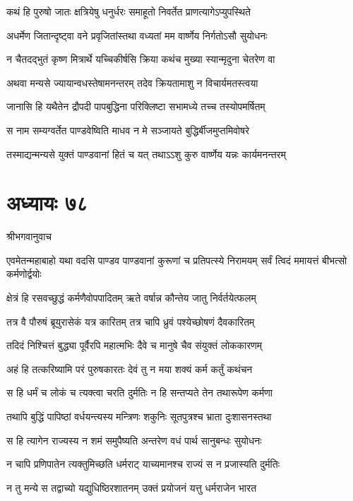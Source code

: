 \twolineshloka
{कथं हि पुरुषो जातः क्षत्रियेषु धनुर्धरः}
{समाहूतो निवर्तेत प्राणत्यागेऽप्युपस्थिते}


\twolineshloka
{अधर्मेण जितान्दृष्ट्वा वने प्रवृजितांस्तथा}
{वध्यतां मम वार्ष्णेय निर्गतोऽसौ सुयोधनः}


\twolineshloka
{न चैतदद्भुतं कृष्ण मित्रार्थे यच्चिकीर्षसि}
{क्रिया कथंच मुख्या स्यान्मृदुना चेतरेण वा}


\twolineshloka
{अथवा मन्यसे ज्यायान्वधस्तेषामनन्तरम्}
{तदेव क्रियतामाशु न विचार्यमतस्त्वया}


\twolineshloka
{जानासि हि यथैतेन द्रौपदी पापबुद्धिना}
{परिक्लिष्टा सभामध्ये तच्च तस्योपमर्षितम्}


\twolineshloka
{स नाम सम्यग्वर्तेत पाण्डवेष्विति माधव}
{न मे सञ्जायते बुद्धिर्बीजमुप्तमिवोषरे}


\twolineshloka
{तस्माद्यन्मन्यसे युक्तं पाण्डवानां हितं च यत्}
{तथाऽऽशु कुरु वार्ष्णेय यन्नः कार्यमनन्तरम्}


\chapter{अध्यायः ७८}
\twolineshloka
{श्रीभगवानुवाच}
{}


\threelineshloka
{एवमेतन्महाबाहो यथा वदसि पाण्डव}
{पाण्डवानां कुरूणां च प्रतिपत्स्ये निरामयम्}
{सर्वं त्विदं ममायत्तं बीभत्सो कर्मणोर्द्वयोः}


\twolineshloka
{क्षेत्रं हि रसवच्छुद्धं कर्मणैवोपपादितम्}
{ऋते वर्षान्न कौन्तेय जातु निर्वर्तयेत्फलम्}


\twolineshloka
{तत्र वै पौरुषं ब्रूयुरासेकं यत्र कारितम्}
{तत्र चापि ध्रुवं पश्येच्छोषणं दैवकारितम्}


\twolineshloka
{तदिदं निश्चित्तं बुद्ध्या पूर्वैरपि महात्मभिः}
{दैवे च मानुषे चैव संयुक्तं लोककारणम्}


\twolineshloka
{अहं हि तत्करिष्यामि परं पुरुषकारतः}
{देवं तु न मया शक्यं कर्म कर्तुं कथंचन}


\twolineshloka
{स हि धर्मं च लोकं च त्यक्त्वा चरति दुर्मतिः}
{न हि सन्तप्यते तेन तथारूपेण कर्मणा}


\twolineshloka
{तथापि बुद्धिं पापिष्ठां वर्धयन्त्यस्य मन्त्रिणः}
{शकुनिः सूतपुत्रश्च भ्राता दुःशासनस्तथा}


\twolineshloka
{स हि त्यागेन राज्यस्य न शमं समुपैष्यति}
{अन्तरेण वधं पार्थ सानुबन्धः सुयोधनः}


\twolineshloka
{न चापि प्रणिपातेन त्यक्तुमिच्छति धर्मराट्}
{याच्यमानश्च राज्यं स न प्रजास्यति दुर्मतिः}


\twolineshloka
{न तु मन्ये स तद्वाच्यो यद्युधिष्ठिरशातनम्}
{उक्तं प्रयोजनं यत्तु धर्मराजेन भारत}


